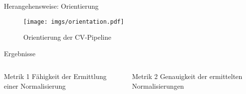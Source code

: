 \begin{frame}{Herangehensweise: Orientierung}
    \begin{figure}
        \centering
        \texttt{[image: imgs/orientation.pdf]}
        \caption{Orientierung der CV-Pipeline}
    \end{figure}
\end{frame}

\begin{frame}{Ergebnisse}

    \begin{columns}
        \begin{column}{0.5\linewidth}

            \begin{block}{Metrik 1}
                \small Fähigkeit der Ermittlung einer Normalisierung
            \end{block}

        \end{column}
        \begin{column}{0.5\linewidth}

            \begin{block}{Metrik 2}
                \small Genauigkeit der ermittelten Normalisierungen
            \end{block}

        \end{column}
    \end{columns}

    \begin{columns}
        \begin{column}{0.45\linewidth}


        \end{column}
        \begin{column}{0.1\linewidth}
            \vspace*{2cm}
        \end{column}
        \begin{column}{0.45\linewidth}


        \end{column}
    \end{columns}
\end{frame}
